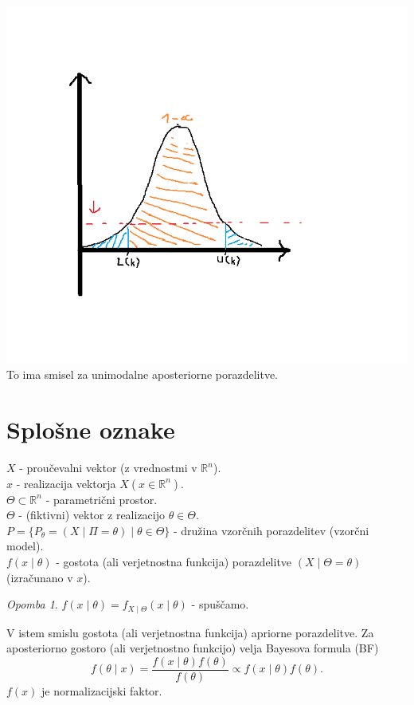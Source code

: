 \documentclass[a4paper, 12pt]{book}
\theoremstyle{definition}
\theoremstyle{remark}
\newtheorem*{rem}{Opomba}
\newcommand{\R}{\mathbb{R}}
\begin{document}
\includegraphics[scale=0.5]{interval_kredibilnostni_1_5} \\
To ima smisel za unimodalne aposteriorne porazdelitve.


\section{Splošne oznake}

$X$ - proučevalni vektor (z vrednostmi v $\R^n$). \\
$x$ - realizacija vektorja $X (x \in \R^n)$. \\
$\Theta \subset \R^n$ - parametrični prostor. \\
$\Theta$ - (fiktivni) vektor z realizacijo $\theta \in \Theta$. \\
$P = \{P_{\theta} = (X \mid \Pi = \theta) \mid \theta \in \Theta\}$ - družina vzorčnih porazdelitev (vzorčni model). \\
$f(x \mid \theta)$ - gostota (ali verjetnostna funkcija) porazdelitve $(X \mid \Theta = \theta)$
(izračunano v $x$). \\
\begin{rem}
  $f(x \mid \theta) = f_{X \mid \Theta}(x \mid \theta)$ - spuščamo.
\end{rem}
V istem smislu gostota (ali verjetnostna funkcija) apriorne porazdelitve.
Za aposteriorno gostoro (ali verjetnostno funkcijo) velja Bayesova formula (BF)
\begin{equation*}
  f(\theta \mid x) = \frac{f(x \mid \theta) f(\theta)}{f(\theta)} \propto f(x \mid \theta) f(\theta).
\end{equation*}
$f(x)$ je normalizacijski faktor.
\end{document}
